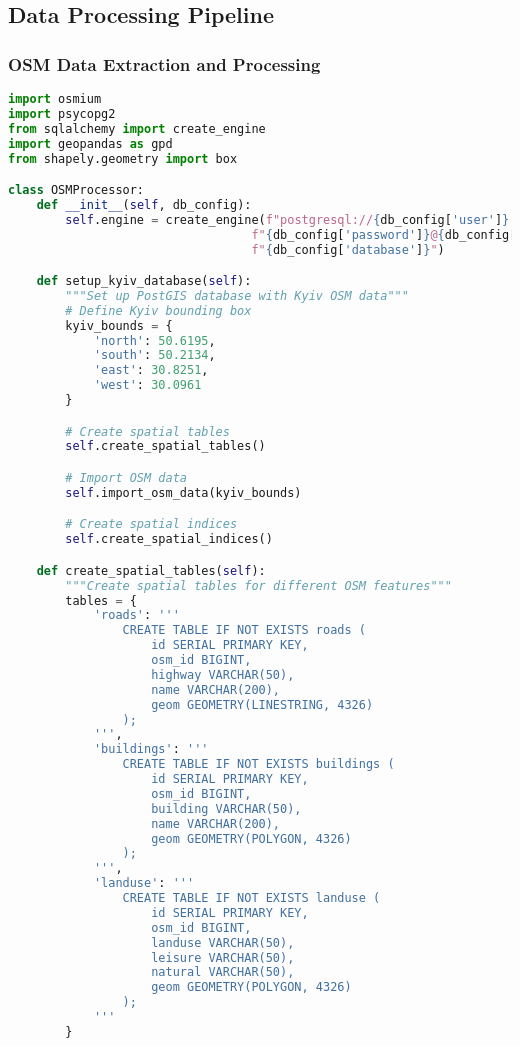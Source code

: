 \subsection{Data Processing Pipeline}

\subsubsection{OSM Data Extraction and Processing}

\begin{lstlisting}[language=Python, caption=Complete OSM Data Processing Pipeline]
import osmium
import psycopg2
from sqlalchemy import create_engine
import geopandas as gpd
from shapely.geometry import box

class OSMProcessor:
    def __init__(self, db_config):
        self.engine = create_engine(f"postgresql://{db_config['user']}:"
                                  f"{db_config['password']}@{db_config['host']}/"
                                  f"{db_config['database']}")

    def setup_kyiv_database(self):
        """Set up PostGIS database with Kyiv OSM data"""
        # Define Kyiv bounding box
        kyiv_bounds = {
            'north': 50.6195,
            'south': 50.2134,
            'east': 30.8251,
            'west': 30.0961
        }

        # Create spatial tables
        self.create_spatial_tables()

        # Import OSM data
        self.import_osm_data(kyiv_bounds)

        # Create spatial indices
        self.create_spatial_indices()

    def create_spatial_tables(self):
        """Create spatial tables for different OSM features"""
        tables = {
            'roads': '''
                CREATE TABLE IF NOT EXISTS roads (
                    id SERIAL PRIMARY KEY,
                    osm_id BIGINT,
                    highway VARCHAR(50),
                    name VARCHAR(200),
                    geom GEOMETRY(LINESTRING, 4326)
                );
            ''',
            'buildings': '''
                CREATE TABLE IF NOT EXISTS buildings (
                    id SERIAL PRIMARY KEY,
                    osm_id BIGINT,
                    building VARCHAR(50),
                    name VARCHAR(200),
                    geom GEOMETRY(POLYGON, 4326)
                );
            ''',
            'landuse': '''
                CREATE TABLE IF NOT EXISTS landuse (
                    id SERIAL PRIMARY KEY,
                    osm_id BIGINT,
                    landuse VARCHAR(50),
                    leisure VARCHAR(50),
                    natural VARCHAR(50),
                    geom GEOMETRY(POLYGON, 4326)
                );
            '''
        }


\end{lstlisting}
